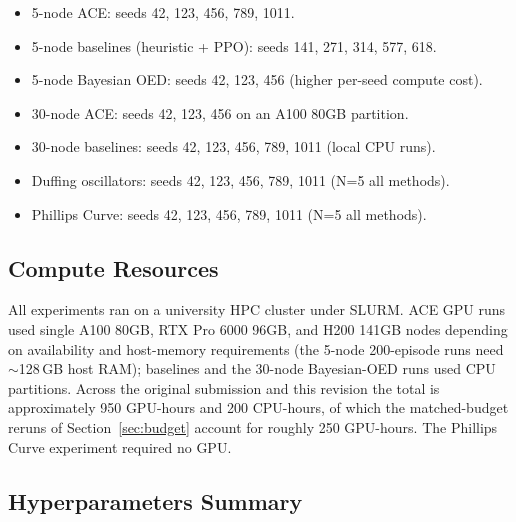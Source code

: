 \documentclass[twoside]{article}
\theoremstyle{plain}
\theoremstyle{definition}
\theoremstyle{remark}
\begin{document}
\begin{itemize}[leftmargin=1.2em,topsep=0.2em,itemsep=0.1em]
\item 5-node ACE: seeds 42, 123, 456, 789, 1011.
\item 5-node baselines (heuristic + PPO): seeds 141, 271, 314, 577, 618.
\item 5-node Bayesian OED: seeds 42, 123, 456 (higher per-seed compute cost).
\item 30-node ACE: seeds 42, 123, 456 on an A100 80GB partition.
\item 30-node baselines: seeds 42, 123, 456, 789, 1011 (local CPU runs).
\item Duffing oscillators: seeds 42, 123, 456, 789, 1011 (N=5 all methods).
\item Phillips Curve: seeds 42, 123, 456, 789, 1011 (N=5 all methods).
\end{itemize}

\subsection{Compute Resources}

All experiments ran on a university HPC cluster under SLURM. ACE GPU runs used single A100 80GB, RTX Pro 6000 96GB, and H200 141GB nodes depending on availability and host-memory requirements (the 5-node 200-episode runs need $\sim$128\,GB host RAM); baselines and the 30-node Bayesian-OED runs used CPU partitions. Across the original submission and this revision the total is approximately 950 GPU-hours and 200 CPU-hours, of which the matched-budget reruns of Section~\ref{sec:budget} account for roughly 250 GPU-hours. The Phillips Curve experiment required no GPU.

\subsection{Hyperparameters Summary}
\label{app:hyper-summary}
\end{document}
